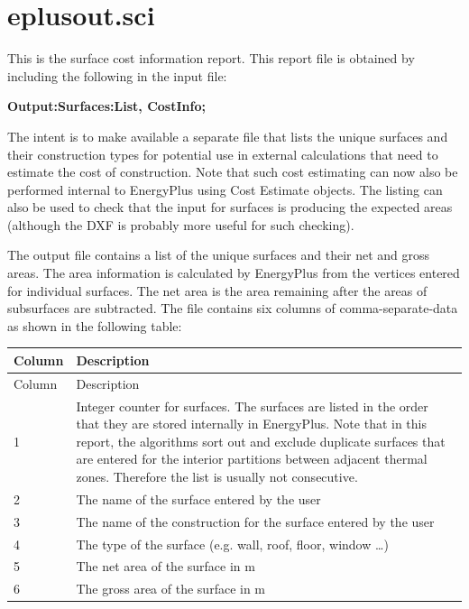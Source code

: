 \section{eplusout.sci}\label{eplusout.sci}

This is the surface cost information report. This report file is obtained by including the following in the input file:

\textbf{Output:Surfaces:List, CostInfo;}

The intent is to make available a separate file that lists the unique surfaces and their construction types for potential use in external calculations that need to estimate the cost of construction. Note that such cost estimating can now also be performed internal to EnergyPlus using Cost Estimate objects. The listing can also be used to check that the input for surfaces is producing the expected areas (although the DXF is probably more useful for such checking).

The output file contains a list of the unique surfaces and their net and gross areas. The area information is calculated by EnergyPlus from the vertices entered for individual surfaces. The net area is the area remaining after the areas of subsurfaces are subtracted. The file contains six columns of comma-separate-data as shown in the following table:

\begin{longtable}[c]{p{1.5in}p{4.5in}}
\toprule
Column & Description \tabularnewline
\midrule
\endfirsthead

\toprule
Column & Description \tabularnewline
\midrule
\endhead

1 & Integer counter for surfaces. The surfaces are listed in the order that they are stored internally in EnergyPlus. Note that in this report, the algorithms sort out and exclude duplicate surfaces that are entered for the interior partitions between adjacent thermal zones. Therefore the list is usually not consecutive. \tabularnewline
2 & The name of the surface entered by the user \tabularnewline
3 & The name of the construction for the surface entered by the user \tabularnewline
4 & The type of the surface (e.g. wall, roof, floor, window …) \tabularnewline
5 & The net area of the surface in m \tabularnewline
6 & The gross area of the surface in m \tabularnewline
\bottomrule
\end{longtable}
